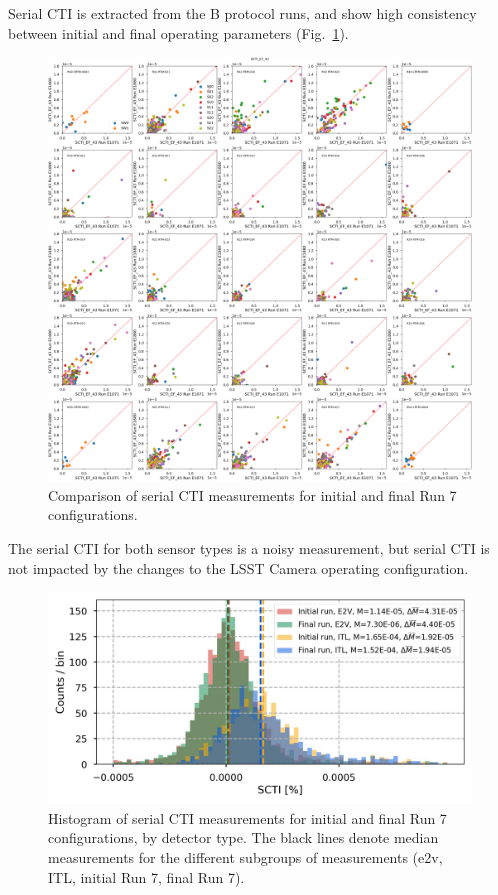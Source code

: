 Serial CTI is extracted from the B protocol runs, and show high consistency between initial and final operating parameters (Fig.~\ref{fig:finalChar-SCTI-5x5}). 

\begin{figure}[ht]
    \centering
    \includegraphics[width=0.7\linewidth]{figures/finalCharacterization/E1071_E1880_SCTI_EF_43_inset.png}
    \caption{Comparison of serial CTI measurements for initial and final Run 7 configurations.}
    \label{fig:finalChar-SCTI-5x5}
\end{figure}

The serial CTI for both sensor types is a noisy measurement, but serial CTI is not impacted by the changes to the LSST Camera operating configuration.

\begin{figure}[ht]
    \centering
    \includegraphics[width=0.7\linewidth]{figures/finalCharacterization/SCTIComp(6).jpg}
    \caption{Histogram of serial CTI measurements for initial and final Run 7 configurations, by detector type. The black lines denote median measurements for the different subgroups of measurements (e2v, ITL, initial Run 7, final Run 7).}
    \label{fig:finalChar-SCTI-hist}
\end{figure}

